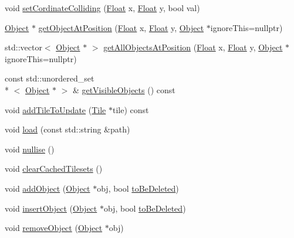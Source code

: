 \begin{DoxyCompactItemize}
\item 
void \hyperlink{classZeta_1_1Map_a696046ca9c8e32e74c830473358fab17}{set\+Cordinate\+Colliding} (\hyperlink{namespaceZeta_a1e0a1265f9b3bd3075fb0fabd39088ba}{Float} x, \hyperlink{namespaceZeta_a1e0a1265f9b3bd3075fb0fabd39088ba}{Float} y, bool val)
\item 
\hyperlink{classZeta_1_1Object}{Object} $\ast$ \hyperlink{classZeta_1_1Map_a65be7fa78fde99a6899858b6a378f0ff}{get\+Object\+At\+Position} (\hyperlink{namespaceZeta_a1e0a1265f9b3bd3075fb0fabd39088ba}{Float} x, \hyperlink{namespaceZeta_a1e0a1265f9b3bd3075fb0fabd39088ba}{Float} y, \hyperlink{classZeta_1_1Object}{Object} $\ast$ignore\+This=nullptr)
\item 
std\+::vector$<$ \hyperlink{classZeta_1_1Object}{Object} $\ast$ $>$ \hyperlink{classZeta_1_1Map_ab0a72c0184d3623f4c5ec5a97f2fbf5d}{get\+All\+Objects\+At\+Position} (\hyperlink{namespaceZeta_a1e0a1265f9b3bd3075fb0fabd39088ba}{Float} x, \hyperlink{namespaceZeta_a1e0a1265f9b3bd3075fb0fabd39088ba}{Float} y, \hyperlink{classZeta_1_1Object}{Object} $\ast$ignore\+This=nullptr)
\item 
const std\+::unordered\+\_\+set\\*
$<$ \hyperlink{classZeta_1_1Object}{Object} $\ast$ $>$ \& \hyperlink{classZeta_1_1Map_ab6eea0b928a00906163751cd8c3c3ffe}{get\+Visible\+Objects} () const 
\item 
void \hyperlink{classZeta_1_1Map_add631106527f8d2d596698242a4052cd}{add\+Tile\+To\+Update} (\hyperlink{classZeta_1_1Tile}{Tile} $\ast$tile) const 
\item 
void \hyperlink{classZeta_1_1Map_a9e76ebd42c7c4c0d9d19769dabe5ae4c}{load} (const std\+::string \&path)
\item 
void \hyperlink{classZeta_1_1Map_a89c43b931650ea3a821f552ebc502268}{nullise} ()
\item 
void \hyperlink{classZeta_1_1Map_adc7b5ab14aabe2fbbe7348a86dec51cf}{clear\+Cached\+Tilesets} ()
\item 
void \hyperlink{classZeta_1_1Map_a2b64eee9d40bae1881b9a791197bf009}{add\+Object} (\hyperlink{classZeta_1_1Object}{Object} $\ast$obj, bool \hyperlink{classZeta_1_1Map_a5de1db4936f619768db7ee633eb0c696}{to\+Be\+Deleted})
\item 
void \hyperlink{classZeta_1_1Map_ae508c20f9331cd5d6f4ff353cd13e5c1}{insert\+Object} (\hyperlink{classZeta_1_1Object}{Object} $\ast$obj, bool \hyperlink{classZeta_1_1Map_a5de1db4936f619768db7ee633eb0c696}{to\+Be\+Deleted})
\item 
void \hyperlink{classZeta_1_1Map_adee694d959e68748624dd76ea7553689}{remove\+Object} (\hyperlink{classZeta_1_1Object}{Object} $\ast$obj)

\end{DoxyCompactItemize}
